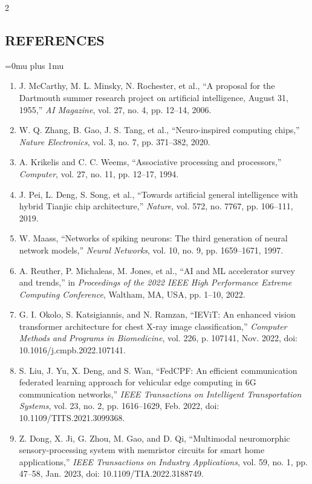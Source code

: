 \begin{multicols}{2}
  \subsection*{\centering\uppercase{References}}
  {\small
  \begingroup\justifying
  \Urlmuskip=0mu plus 1mu\relax
  \begin{enumerate}[leftmargin=*,itemsep=0.20em]
    \item J. McCarthy, M. L. Minsky, N. Rochester, et al., “A proposal for the Dartmouth summer research project on artificial intelligence, August 31, 1955,” \textit{AI Magazine}, vol. 27, no. 4, pp. 12--14, 2006.
    \item W. Q. Zhang, B. Gao, J. S. Tang, et al., “Neuro-inspired computing chips,” \textit{Nature Electronics}, vol. 3, no. 7, pp. 371--382, 2020.
    \item A. Krikelis and C. C. Weems, “Associative processing and processors,” \textit{Computer}, vol. 27, no. 11, pp. 12--17, 1994.
    \item J. Pei, L. Deng, S. Song, et al., “Towards artificial general intelligence with hybrid Tianjic chip architecture,” \textit{Nature}, vol. 572, no. 7767, pp. 106--111, 2019.
    \item W. Maass, “Networks of spiking neurons: The third generation of neural network models,” \textit{Neural Networks}, vol. 10, no. 9, pp. 1659--1671, 1997.
    \item A. Reuther, P. Michaleas, M. Jones, et al., “AI and ML accelerator survey and trends,” in \textit{Proceedings of the 2022 IEEE High Performance Extreme Computing Conference}, Waltham, MA, USA, pp. 1--10, 2022.
    \item G. I. Okolo, S. Katsigiannis, and N. Ramzan, “IEViT: An enhanced vision transformer architecture for chest X-ray image classification,” \textit{Computer Methods and Programs in Biomedicine}, vol. 226, p. 107141, Nov. 2022, doi: 10.1016/j.cmpb.2022.107141.
    \item S. Liu, J. Yu, X. Deng, and S. Wan, “FedCPF: An efficient communication federated learning approach for vehicular edge computing in 6G communication networks,” \textit{IEEE Transactions on Intelligent Transportation Systems}, vol. 23, no. 2, pp. 1616--1629, Feb. 2022, doi: 10.1109/TITS.2021.3099368.
    \item Z. Dong, X. Ji, G. Zhou, M. Gao, and D. Qi, “Multimodal neuromorphic sensory-processing system with memristor circuits for smart home applications,” \textit{IEEE Transactions on Industry Applications}, vol. 59, no. 1, pp. 47--58, Jan. 2023, doi: 10.1109/TIA.2022.3188749.

\end{enumerate}}
\end{multicols}
